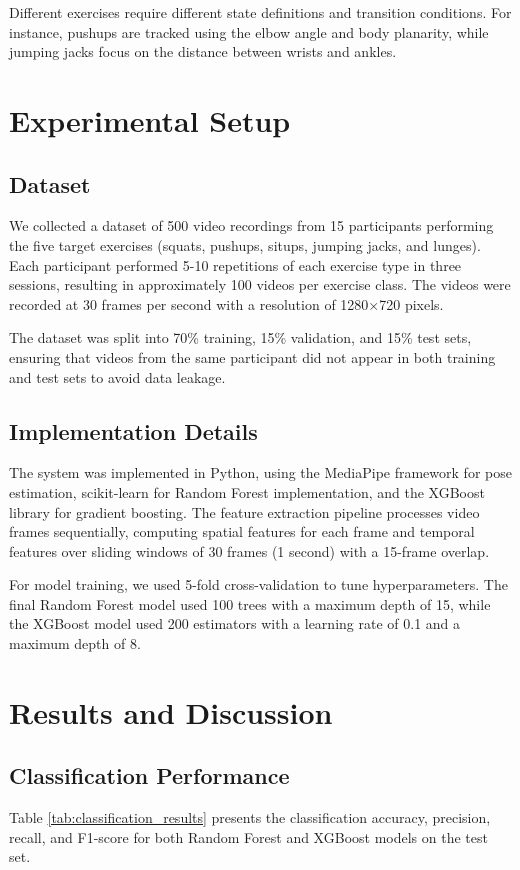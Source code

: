 \documentclass[conference]{IEEEtran}
\begin{document}
Different exercises require different state definitions and transition conditions. For instance, pushups are tracked using the elbow angle and body planarity, while jumping jacks focus on the distance between wrists and ankles.

\section{Experimental Setup}
\subsection{Dataset}
We collected a dataset of 500 video recordings from 15 participants performing the five target exercises (squats, pushups, situps, jumping jacks, and lunges). Each participant performed 5-10 repetitions of each exercise type in three sessions, resulting in approximately 100 videos per exercise class. The videos were recorded at 30 frames per second with a resolution of 1280×720 pixels.

The dataset was split into 70\% training, 15\% validation, and 15\% test sets, ensuring that videos from the same participant did not appear in both training and test sets to avoid data leakage.

\subsection{Implementation Details}
The system was implemented in Python, using the MediaPipe framework for pose estimation, scikit-learn for Random Forest implementation, and the XGBoost library for gradient boosting. The feature extraction pipeline processes video frames sequentially, computing spatial features for each frame and temporal features over sliding windows of 30 frames (1 second) with a 15-frame overlap.

For model training, we used 5-fold cross-validation to tune hyperparameters. The final Random Forest model used 100 trees with a maximum depth of 15, while the XGBoost model used 200 estimators with a learning rate of 0.1 and a maximum depth of 8.

\section{Results and Discussion}
\subsection{Classification Performance}
Table \ref{tab:classification_results} presents the classification accuracy, precision, recall, and F1-score for both Random Forest and XGBoost models on the test set.
\end{document}
